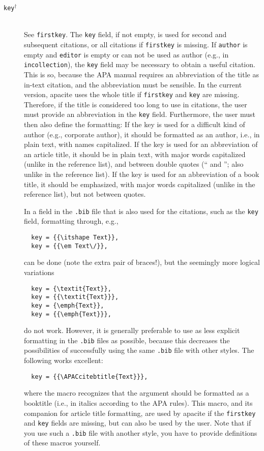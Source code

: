 \documentclass{article}
\newcommand{\LC}{\mbox{${}^{\dag}$}}%
\newcommand{\pkg}[1]{\textsf{#1}}%
\newcommand{\fname}[1]{\texttt{#1}}%
\newcommand{\fieldname}[1]{\texttt{#1}}%
\newcommand{\entryname}[1]{\texttt{#1}}%
\newcommand{\cmd}[1]{\texttt{\string#1}}%
\begin{document}
\begin{description}
    \item[\fieldname{key}\LC] \mbox{}\\
       See \fieldname{firstkey}. The \fieldname{key} field, if not
       empty, is used for second and subsequent citations, or all citations
       if \fieldname{firstkey} is missing. If \fieldname{author} is
       empty and \fieldname{editor} is empty or can not be used as
       author (e.g., in \entryname{incollection}), the \fieldname{key}
       field may be necessary to obtain a useful citation. This is
       so, because the APA manual requires an abbreviation of the
       title as in-text citation, and the abbreviation must be
       sensible. In the current version, \pkg{apacite} uses the
       whole title if \fieldname{firstkey} and \fieldname{key} are missing.
       Therefore, if the title is considered too long to use in citations,
       the user must provide an abbreviation in the \fieldname{key} field.
       Furthermore, the user must then also define the formatting:
       If the key is used for a difficult kind of author (e.g.,
       corporate author), it should be formatted as an author,
       i.e., in plain text, with names capitalized.
       If the key is used for an abbreviation of an article
       title, it should be in plain text, with major words capitalized
       (unlike in the reference list), and between double quotes
       (`` and ''; also unlike in the reference list).
       If the key is used for an abbreviation of a book title, it
       should be emphasized, with major words capitalized
       (unlike in the reference list), but not between quotes.

       In a field in the \fname{.bib} file that is also
       used for the citations, such as the \fieldname{key} field,
       formatting through, e.g.,
\begin{verbatim}
  key = {{\itshape Text}},
  key = {{\em Text\/}},
\end{verbatim}
       can be done (note the extra pair of braces!), but the
       seemingly more logical variations
\begin{verbatim}
  key = {\textit{Text}},
  key = {{\textit{Text}}},
  key = {\emph{Text}},
  key = {{\emph{Text}}},
\end{verbatim}
       do not work.
       However, it is generally preferable to use as less explicit
       formatting in the \fname{.bib} files as possible, because this
       decreases the possibilities of successfully using the
       same \fname{.bib} file with other styles. The following works
       excellent:
\begin{verbatim}
  key = {{\APACcitebtitle{Text}}},
\end{verbatim}
       where the \cmd{\APACcitebtitle} macro recognizes that the argument
       should be formatted as a booktitle (i.e., in italics according to the
       APA rules). This macro, and its companion \cmd{\APACciteatitle} for
       article title formatting, are used by \pkg{apacite} if the
       \fieldname{firstkey} and \fieldname{key} fields are missing,
       but can also be used by the user. Note that if you use such a
       \fname{.bib} file with another style, you have to provide
       definitions of these macros yourself.


\end{description}
\end{document}

